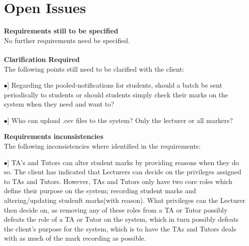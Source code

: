 \documentclass[12pt, a4paper]{scrartcl}
\newcommand{\tab}[1]{\hspace{.05\textwidth}\rlap{#1}}
\begin{document}
		\section{Open Issues}
		\textbf{Requirements still to be specified}\\
		No further requirements need be specified.\\
		\vspace{0.05cm}\\
		\textbf{Clarification Required}\\
		The following points still need to be clarified with the client:
		\begin{description}
			\item \tab [$\bullet$] Regarding the pooled-notifications for students, should a batch be sent periodically to students or should students simply check their marks on the system when they need and want to?
			\item \tab [$\bullet$] Who can upload .csv files to the system? Only the lecturer or all markers?
		\end{description}
		\vspace{0.3cm}
		\textbf{Requirements inconsistencies}\\
		The following inconsistencies where identified in the requirements:
		\begin{description}			
			\item \tab [$\bullet$] TA’s and Tutors can alter student marks by providing reasons when they do so. The client has indicated that Lecturers can decide on the privileges assigned to TAs and Tutors. However, TAs and Tutors only have two core roles which define their purpose on the system; recording student marks and altering/updating studenft marks(with reason). What privileges can the Lecturer then decide on, as removing any of these roles from a TA or Tutor possibly defeats the role of a TA or Tutor on the system, which in turn possibly defeats the client’s purpose for the system, which is to have the TAs and Tutors deals with as much of the mark recording as possible.
		\end{description}
\end{document}
